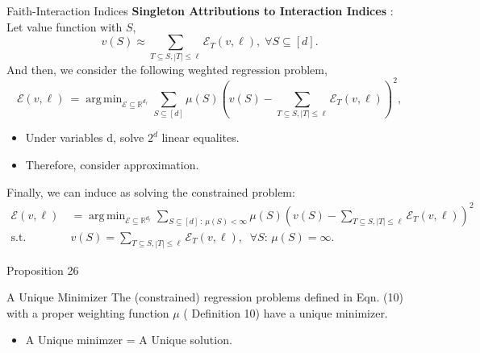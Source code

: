 \documentclass[10pt]{beamer}
\newcommand{\f}{v}
\newcommand{\ex}{\Expl}
\def\Expl{\mathcal{E}}
\DeclareMathOperator*{\argmin}{arg\,min}
\begin{document}
\begin{frame}{Faith-Interaction Indices}
    \textbf{Singleton Attributions to Interaction Indices} : \\
    Let value function with $S$, \[\f(S) \approx \sum_{T \subseteq S, |T| \leq \ell} \Expl_T(\f,\ell),\; \forall S \subseteq [d].\]
    And then, we consider the following weghted regression problem,
    \begin{equation*}
    \label{eqn:weighted_regression}
    \ex(\f, \ell) \ = \argmin_{\Expl \subseteq \mathbb{R}^{d_\ell} } 
    \sum_{S \subseteq [d]}  \mu(S) \left( \f(S) - \sum_{T \subseteq S , |T| \leq \ell}\Expl_T(\f,\ell) \right)^2,
    \tag{9}
    \end{equation*}
    \vspace{1.5em}
    \begin{itemize}[label=\scalebox{0.5}{$\blacksquare$}]
        \item Under variables d, solve $2^d$ linear equalites.
        \item Therefore, consider approximation. 
    \end{itemize}
\end{frame}
\begin{frame}
    Finally, we can induce as solving the constrained problem:
    \begin{align*}
    \ex(\f, \ell) \ 
    &= \argmin_{\Expl \subseteq \mathbb{R}^{d_\ell} } \sum_{S \subseteq [d]\,:\, \mu(S) < \infty}  \mu(S) \left( \f(S) - \sum_{T \subseteq S , |T| \leq \ell}\Expl_T(\f,\ell) \right)^2 \nonumber \\
    \text{s.t.} \ & \f(S) = \sum_{T \subseteq S , |T| \leq \ell}\Expl_T(\f,\ell), \;\;\forall S :\, \mu(S) = \infty.
    \label{eqn:constrained_weighted_regresion}
    \tag{10}
    \end{align*}
\end{frame}
\begin{frame}{Proposition 26}
    \begin{myaxiombox}{A Unique Minimizer}
        The (constrained) regression problems defined in  Eqn. (10) with a proper weighting function $\mu$ ( Definition 10)
        have a unique minimizer.
    \end{myaxiombox}
    \vspace{1.5em}
    \begin{itemize}[label=\scalebox{0.5}{$\blacksquare$}]
        \item A Unique minimzer = A Unique solution.
    \end{itemize}
\end{frame}
\end{document}
